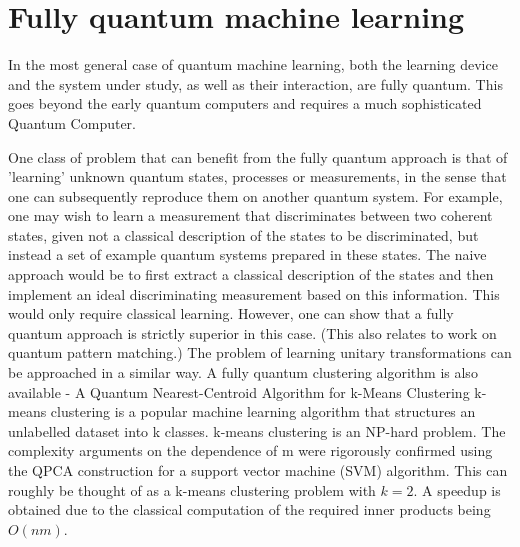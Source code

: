 \section{Fully quantum machine learning}
In the most general case of quantum machine learning, both the learning device and the system under study, as well as their interaction, are fully quantum. This goes beyond the early quantum computers and requires a much sophisticated Quantum Computer.\par\bigskip
One class of problem that can benefit from the fully quantum approach is that of 'learning' unknown quantum states, processes or measurements, in the sense that one can subsequently reproduce them on another quantum system. For example, one may wish to learn a measurement that discriminates between two coherent states, given not a classical description of the states to be discriminated, but instead a set of example quantum systems prepared in these states. The naive approach would be to first extract a classical description of the states and then implement an ideal discriminating measurement based on this information. This would only require classical learning. However, one can show that a fully quantum approach is strictly superior in this case. (This also relates to work on quantum pattern matching.) The problem of learning unitary transformations can be approached in a similar way.
A fully quantum clustering algorithm is also available - A Quantum Nearest-Centroid Algorithm for k-Means Clustering k-means clustering is a popular machine learning algorithm that structures an unlabelled dataset into k classes. k-means clustering is an NP-hard problem. The complexity arguments on the dependence of m were rigorously confirmed using the QPCA construction for a support vector machine (SVM) algorithm. This can roughly be thought of as a k-means clustering problem with $k=2$. A speedup is obtained due to the classical computation of the required inner products being $O(nm)$.


